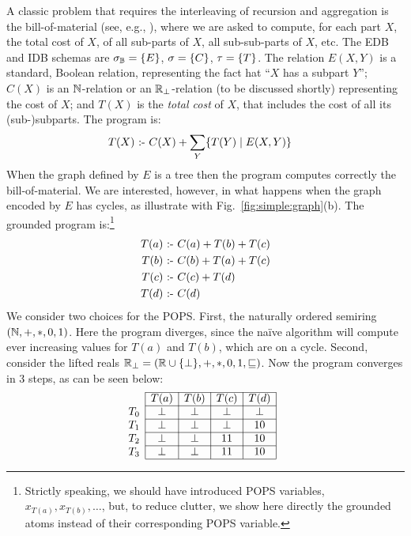 \begin{ex} \label{ex:sum1:sum2} A classic problem that requires the
  interleaving of recursion and aggregation is the bill-of-material
  (see, e.g., \cite{DBLP:conf/amw/ZanioloYIDSC18}), where we are asked
  to compute, for each part $X$, the total cost of $X$, of all
  sub-parts of $X$, all sub-sub-parts of $X$, etc.  The EDB and IDB
  schemas are $\sigma_\mathbb B = \{E\}$, $\sigma = \{C\}$,
  $\tau=\{T\}$.  The relation $E(X,Y)$ is a standard, Boolean
  relation, representing the fact hat ``$X$ has a subpart $Y$''; $C(X)$
  is an $\mathbb N$-relation or an $\mathbb R_\bot$-relation (to be discussed
  shortly) representing the cost of $X$; and $T(X)$ is the {\em total
    cost} of $X$, that includes the cost of all its (sub-)subparts.
  The \datalogo program is:
  \begin{align*}
    T(X) \text{ :- } & C(X) + \sum_Y \{{T(Y)}\mid{E(X,Y)}\}
  \end{align*}
  When the graph defined by $E$ is a tree then the program computes
  correctly the bill-of-material.  We are interested, however, in what
  happens when the graph encoded by $E$ has cycles, as illustrate with
  Fig.~\ref{fig:simple:graph}(b).  The grounded program
  is:\footnote{Strictly speaking, we should have introduced POPS
    variables, $x_{T(a)}, x_{T(b)}, \ldots$, but, to reduce clutter,
    we show here directly the grounded atoms instead of their
    corresponding POPS variable.}
  \begin{align*}
    T(a) \text{ :- } & C(a) + T(b) + T(c) \\
    T(b) \text{ :- } & C(b) + T(a) + T(c) \\
    T(c) \text{ :- } & C(c) + T(d) \\
    T(d) \text{ :- } & C(d)
  \end{align*}
  We consider two choices for the POPS.  First, the naturally ordered
  semiring $(\mathbb N, +, *, 0, 1)$. Here the program diverges, since the
  na\"ive algorithm will compute ever increasing values for $T(a)$ and
  $T(b)$, which are on a cycle.  Second, consider the lifted reals
  $\mathbb R_\bot = (\mathbb R \cup \{\bot\},+,*,0,1,\sqsubseteq)$.  Now the
  program converges in 3 steps, as can be seen below:
%
  \begin{align*}
    &
      \begin{array}{l|c|c|c|c|} \cline{2-5}
        &T(a)&T(b)&T(c)&T(d) \\ \cline{2-5}
        T_0 & \bot & \bot & \bot & \bot  \\ \cline{2-5}
        T_1 & \bot & \bot & \bot & 10  \\ \cline{2-5}
        T_2 & \bot & \bot & 11 & 10  \\ \cline{2-5}
        T_3 & \bot & \bot & 11 & 10  \\ \cline{2-5}
        \end{array}
  \end{align*}
\end{ex}



